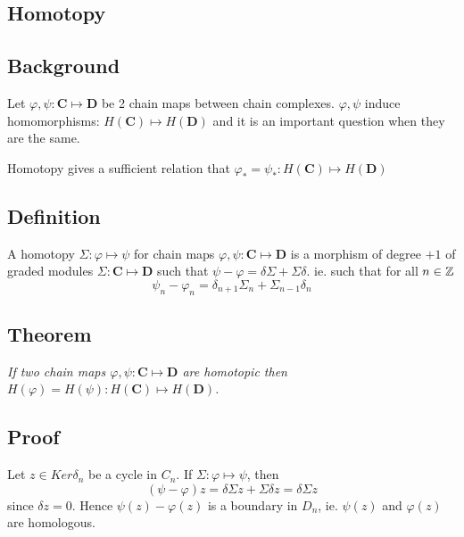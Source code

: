 \subsection{Homotopy}\label{df1.2}
\subsection{Background}\label{df1.2.1}
Let $\varphi,\psi:\textbf{C}\mapsto \textbf{D}$ be 2 chain maps
between chain complexes. $\varphi,\psi$ induce homomorphisms:
$H(\textbf{C})\mapsto H(\textbf{D})$ and it is an important
question when they are the same.

Homotopy gives a sufficient relation that $\varphi_* = \psi_* :
H(\textbf{C})\mapsto H(\textbf{D})$


\subsection{Definition}\label{df1.2.2}
A homotopy $\Sigma :\varphi\mapsto \psi$ for chain maps
$\varphi,\psi:\textbf{C}\mapsto \textbf{D}$ is a morphism of
degree $+1$ of graded modules $\Sigma: \textbf{C}\mapsto
\textbf{D}$ such that $\psi-\varphi = \delta\Sigma +\Sigma
\delta$. ie. such that for all $n\in \mathbb Z$
$$\psi_n - \varphi_n = \delta_{n+1} \Sigma_n +
\Sigma_{n-1}\delta_n$$

\subsection{Theorem}\label{df1.2.3}

\emph{If two chain maps $\varphi,\psi:\textbf{C}\mapsto
\textbf{D}$ are homotopic then
$H(\varphi)=H(\psi):H(\textbf{C})\mapsto H(\textbf{D})$.}

\subsection*{Proof}
Let $z\in Ker \delta_n$ be a cycle in $C_n$. If $\Sigma
:\varphi\mapsto \psi$, then
$$(\psi-\varphi)z=\delta \Sigma z + \Sigma \delta z = \delta
\Sigma z$$ since $\delta z = 0$. Hence $\psi(z)-\varphi(z)$ is a
boundary in $D_n$, ie. $\psi(z)$ and $\varphi(z)$ are homologous.








